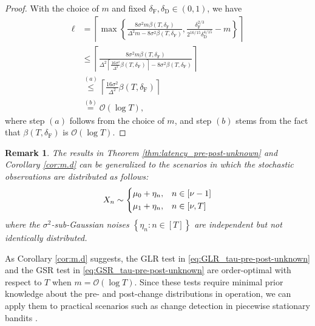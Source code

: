 \documentclass[12pt]{interact}
\newcommand{\lp}{\left(}
\newcommand{\rp}{\right)}
\newcommand{\lb}{\left[}
\newcommand{\rb}{\right]}
\newcommand{\lbp}{\left\{}
\newcommand{\rbp}{\right\}}
\newcommand{\mcal}{\mathcal}
\newcommand{\mrm}{\mathrm}
\newcommand{\lce}{\left\lceil}
\newcommand{\rce}{\right\rceil}
\theoremstyle{plain}
\newtheorem{remark}{Remark}
\begin{document}
\begin{proof}
With the choice of $m$ and fixed $\delta_{\mrm{F}},\delta_{\mrm{D}} \in (0,1)$, we have
%
\begin{align}
\ell &= \lce\max\lbp\frac{8\sigma^{2} m\beta\lp T,\delta_{\mrm{F}}\rp}{\Delta^{2}m-8\sigma^{2}\beta\lp T,\delta_{\mrm{F}}\rp}, \frac{\delta_{\mrm{F}}^{2/3}}{2^{16/15}\delta_{\mrm{D}}^{4/15}} - m\rbp\rce \nonumber\\
&\leq \lce\frac{8\sigma^{2} m\beta\lp T,\delta_{\mrm{F}}\rp}{\Delta^{2} \lce \frac{16\sigma^{2}}{\Delta^{2}}\beta \lp T,\delta_{\mrm{F}}\rp \rce - 8\sigma^{2}\beta\lp T,\delta_{\mrm{F}}\rp}\rce \nonumber\\
&\overset{(a)}{\leq} \lce \frac{16\sigma^{2}}{\Delta^{2}}\beta \lp T,\delta_{\mrm{F}}\rp \rce \nonumber \\
&\overset{(b)}{=} \mcal{O} \lp \log T \rp,
\label{eq:d_upp_glr}
\end{align}
where step $(a)$ follows from the choice of $m$, and step $(b)$ stems from the fact that $\beta \lp T, \delta_{\mrm{F}} \rp$ is $\mcal{O} \lp \log T \rp$.
\end{proof}

\begin{remark}
The results in Theorem \ref{thm:latency_pre-post-unknown} and Corollary \ref{cor:m.d} can be generalized to the scenarios in which the stochastic observations are distributed as follows:
%
\begin{align} \label{eq:sample_distr_general}
    X_{n} \sim \begin{dcases}
        \mu_{0} + \eta_{n},& n \in \lb \nu-1 \rb\\
        \mu_{1} + \eta_{n},& n \in \lb \nu, T \rb
    \end{dcases}
\end{align}
%
where the $\sigma^{2}$-sub-Gaussian noises $\lbp \eta_{n}: n \in \lb T \rb \rbp$ are independent but not identically distributed.
\end{remark}

As Corollary \ref{cor:m.d} suggests, the GLR test in \eqref{eq:GLR_tau-pre-post-unknown} and the GSR test in \eqref{eq:GSR_tau-pre-post-unknown} are order-optimal with respect to $T$ when $m = \mcal{O}\lp \log T \rp$. Since these tests require minimal prior knowledge about the pre- and post-change distributions in operation, we can apply them to practical scenarios such as change detection in piecewise stationary bandits \citep{huang2025change, gerogiannis2025detectionneedfeasibleoptimal}.
\end{document}
